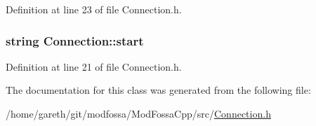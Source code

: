 Definition at line 23 of file Connection.h.

\hypertarget{classConnection_a761d4f36c835443547758ee987454b4b}{
\subsubsection[{start}]{\setlength{\rightskip}{0pt plus 5cm}string {\bf Connection::start}}}
\label{classConnection_a761d4f36c835443547758ee987454b4b}


Definition at line 21 of file Connection.h.



The documentation for this class was generated from the following file:\begin{DoxyCompactItemize}
\item 
/home/gareth/git/modfossa/ModFossaCpp/src/\hyperlink{Connection_8h}{Connection.h}\end{DoxyCompactItemize}
